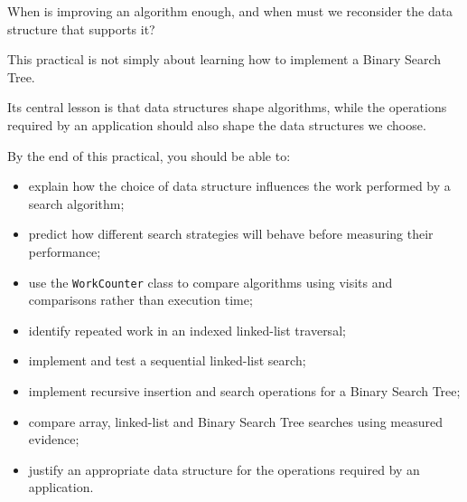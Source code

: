 \documentclass{csc2059practical}
\begin{document}
\begin{engineeringquestion}
When is improving an algorithm enough, and when must we reconsider the data
structure that supports it?
\end{engineeringquestion}

\begin{importantnote}
This practical is not simply about learning how to implement a Binary Search
Tree.

Its central lesson is that data structures shape algorithms, while the
operations required by an application should also shape the data structures we
choose.
\end{importantnote}
\clearpage

\begin{learningoutcomes}

By the end of this practical, you should be able to:

\begin{itemize}
    \item explain how the choice of data structure influences the work performed
          by a search algorithm;
    \item predict how different search strategies will behave before measuring
          their performance;
    \item use the \texttt{WorkCounter} class to compare algorithms using
          visits and comparisons rather than execution time;
    \item identify repeated work in an indexed linked-list traversal;
    \item implement and test a sequential linked-list search;
    \item implement recursive insertion and search operations for a Binary
          Search Tree;
    \item compare array, linked-list and Binary Search Tree searches using
          measured evidence;
    \item justify an appropriate data structure for the operations required by
          an application.
\end{itemize}

\end{learningoutcomes}

\end{document}
